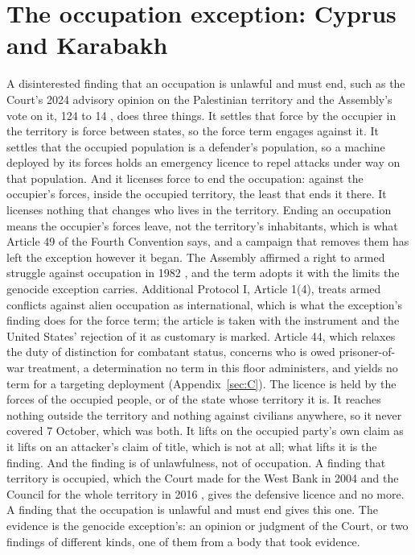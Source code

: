 \section{The occupation exception: Cyprus and Karabakh}
\label{sec:F.5}
A disinterested finding that an occupation is unlawful and must end, such as the Court's 2024 advisory opinion on the Palestinian territory \autocite{icj2024palestine} and the Assembly's vote on it, 124 to 14 \autocite{unga2024es1024}, does three things. It settles that force by the occupier in the territory is force between states, so the force term engages against it. It settles that the occupied population is a defender's population, so a machine deployed by its forces holds an emergency licence to repel attacks under way on that population. And it licenses force to end the occupation: against the occupier's forces, inside the occupied territory, the least that ends it there. It licenses nothing that changes who lives in the territory. Ending an occupation means the occupier's forces leave, not the territory's inhabitants, which is what Article 49 of the Fourth Convention says, and a campaign that removes them has left the exception however it began. The Assembly affirmed a right to armed struggle against occupation in 1982 \autocite{unga1982res3743}, and the term adopts it with the limits the genocide exception carries. Additional Protocol I, Article 1(4), treats armed conflicts against alien occupation as international, which is what the exception's finding does for the force term; the article is taken with the instrument and the United States' rejection of it as customary is marked. Article 44, which relaxes the duty of distinction for combatant status, concerns who is owed prisoner-of-war treatment, a determination no term in this floor administers, and yields no term for a targeting deployment (Appendix~\ref{sec:C}). The licence is held by the forces of the occupied people, or of the state whose territory it is. It reaches nothing outside the territory and nothing against civilians anywhere, so it never covered 7 October, which was both. It lifts on the occupied party's own claim as it lifts on an attacker's claim of title, which is not at all; what lifts it is the finding. And the finding is of unlawfulness, not of occupation. A finding that territory is occupied, which the Court made for the West Bank in 2004 \autocite{icj2004wall} and the Council for the whole territory in 2016 \autocite{unsc2016res2334}, gives the defensive licence and no more. A finding that the occupation is unlawful and must end gives this one. The evidence is the genocide exception's: an opinion or judgment of the Court, or two findings of different kinds, one of them from a body that took evidence.

